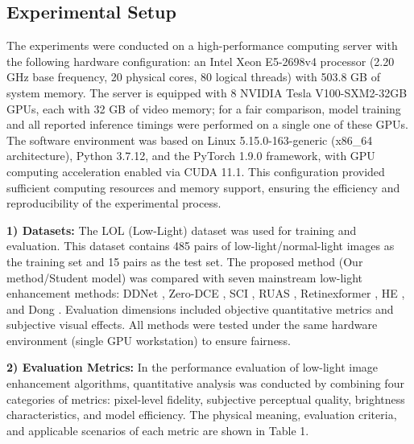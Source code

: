 \documentclass[sensors,article,submit,moreauthors]{Definitions/mdpi}
\begin{document}
\subsection{Experimental Setup}

The experiments were conducted on a high-performance computing server with the following hardware configuration: an Intel Xeon E5-2698v4 processor (2.20 GHz base frequency, 20 physical cores, 80 logical threads) with 503.8 GB of system memory. The server is equipped with 8 NVIDIA Tesla V100-SXM2-32GB GPUs, each with 32 GB of video memory; for a fair comparison, model training and all reported inference timings were performed on a single one of these GPUs. The software environment was based on Linux 5.15.0-163-generic (x86\_64 architecture), Python 3.7.12, and the PyTorch 1.9.0 framework, with GPU computing acceleration enabled via CUDA 11.1. This configuration provided sufficient computing resources and memory support, ensuring the efficiency and reproducibility of the experimental process.

\textbf{1) Datasets:} The LOL (Low-Light) dataset was used for training and evaluation. This dataset contains 485 pairs of low-light/normal-light images as the training set and 15 pairs as the test set. The proposed method (Our method/Student model) was compared with seven mainstream low-light enhancement methods: DDNet \cite{ref25}, Zero-DCE \cite{ref26}, SCI \cite{ref27}, RUAS \cite{ref9}, Retinexformer \cite{ref34}, HE \cite{ref28}, and Dong \cite{ref29}. Evaluation dimensions included objective quantitative metrics and subjective visual effects. All methods were tested under the same hardware environment (single GPU workstation) to ensure fairness.

\textbf{2) Evaluation Metrics:} In the performance evaluation of low-light image enhancement algorithms, quantitative analysis was conducted by combining four categories of metrics: pixel-level fidelity, subjective perceptual quality, brightness characteristics, and model efficiency. The physical meaning, evaluation criteria, and applicable scenarios of each metric are shown in Table 1.
\end{document}
